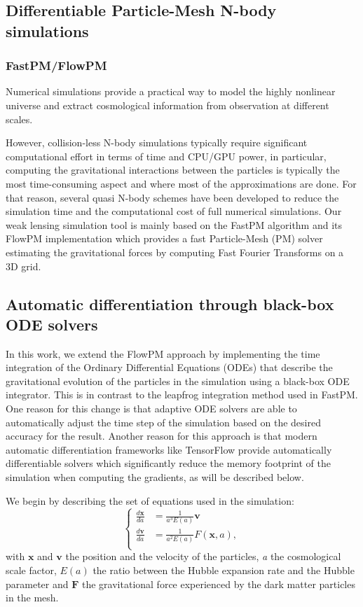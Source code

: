 \documentclass{aa}
\begin{document}
\subsection{Differentiable Particle-Mesh N-body simulations}
\subsubsection{FastPM/FlowPM}

Numerical simulations provide a practical way to model the highly nonlinear universe and extract cosmological information from observation at different scales. 

However, collision-less N-body simulations typically require significant computational effort in terms of time and CPU/GPU power, in particular, computing the gravitational interactions between the particles is typically the most time-consuming aspect and where most of the approximations are done. 
For that reason, several quasi N-body schemes have been developed to reduce the simulation time and the computational cost of full numerical simulations. 
Our weak lensing simulation tool is mainly based on the FastPM algorithm \citep{2019ascl.soft05010F} and its FlowPM \citep{modi2021flowpm} implementation which provides a fast Particle-Mesh (PM) solver estimating the gravitational forces by computing Fast Fourier Transforms on a 3D grid.

\subsection{Automatic differentiation through black-box ODE solvers}\label{Backpropagation_of_ODE_solutions}
In this work, we extend the FlowPM approach by implementing the time integration of the Ordinary Differential Equations
(ODEs) that describe the gravitational evolution of the particles in the simulation using a black-box ODE integrator. This is in contrast to the leapfrog integration method used in FastPM. One reason for this change is that adaptive ODE solvers are able to automatically adjust the time step of the simulation based on the desired accuracy for the result. Another reason for this approach is that modern automatic differentiation frameworks like TensorFlow provide automatically differentiable solvers which significantly reduce the memory footprint of the simulation when computing the gradients, as will be described below.


We begin by describing the set of equations used in the simulation:
\begin{equation}
    \left\{ \begin{array}{ll}
        \frac{d \mathbf{x}}{d a} & = \frac{1}{a^3 E(a)} \mathbf{v} \\
        \frac{d \mathbf{v}}{d a} & =  \frac{1}{a^2 E(a)} F(\mathbf{x}, a), \\
    \end{array} \right.
\end{equation}
with $\mathbf{x}$ and $\mathbf{v}$ the position and the velocity of the particles, \textit{a} the cosmological scale factor, $E(a)$ the ratio between the Hubble expansion rate and the Hubble parameter and $\mathbf{F}$ the gravitational force experienced by the dark matter particles in the mesh.
\end{document}
